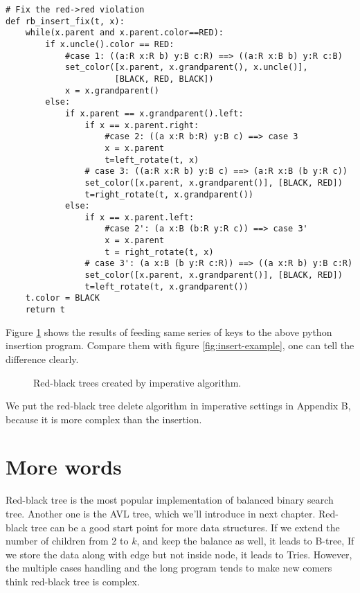 \documentclass[b5paper]{article}
\begin{document}
\begin{lstlisting}
# Fix the red->red violation
def rb_insert_fix(t, x):
    while(x.parent and x.parent.color==RED):
        if x.uncle().color == RED:
            #case 1: ((a:R x:R b) y:B c:R) ==> ((a:R x:B b) y:R c:B)
            set_color([x.parent, x.grandparent(), x.uncle()],
                      [BLACK, RED, BLACK])
            x = x.grandparent()
        else:
            if x.parent == x.grandparent().left:
                if x == x.parent.right:
                    #case 2: ((a x:R b:R) y:B c) ==> case 3
                    x = x.parent
                    t=left_rotate(t, x)
                # case 3: ((a:R x:R b) y:B c) ==> (a:R x:B (b y:R c))
                set_color([x.parent, x.grandparent()], [BLACK, RED])
                t=right_rotate(t, x.grandparent())
            else:
                if x == x.parent.left:
                    #case 2': (a x:B (b:R y:R c)) ==> case 3'
                    x = x.parent
                    t = right_rotate(t, x)
                # case 3': (a x:B (b y:R c:R)) ==> ((a x:R b) y:B c:R)
                set_color([x.parent, x.grandparent()], [BLACK, RED])
                t=left_rotate(t, x.grandparent())
    t.color = BLACK
    return t
\end{lstlisting}

Figure \ref{fig:imperative-insert} shows the results of feeding same
series of keys to the above python insertion program. Compare them with
figure \ref{fig:insert-example}, one can tell the difference clearly.

\begin{figure}[htbp]
   \centering
   \caption{Red-black trees created by imperative algorithm.}
   \label{fig:imperative-insert}
\end{figure}

We put the red-black tree delete algorithm in imperative settings in Appendix B,
because it is more complex than the insertion.

\section{More words}
Red-black tree is the most popular implementation of balanced binary search
tree. Another one is the AVL tree, which we'll introduce in next chapter.
Red-black tree can be a good start point for more data structures. If we
extend the number of children from 2 to $k$, and keep the balance as well,
it leads to B-tree, If we store the data along with edge but not inside
node, it leads to Tries. However, the multiple cases handling and the long
program tends to make new comers think red-black tree is complex.
\end{document}
